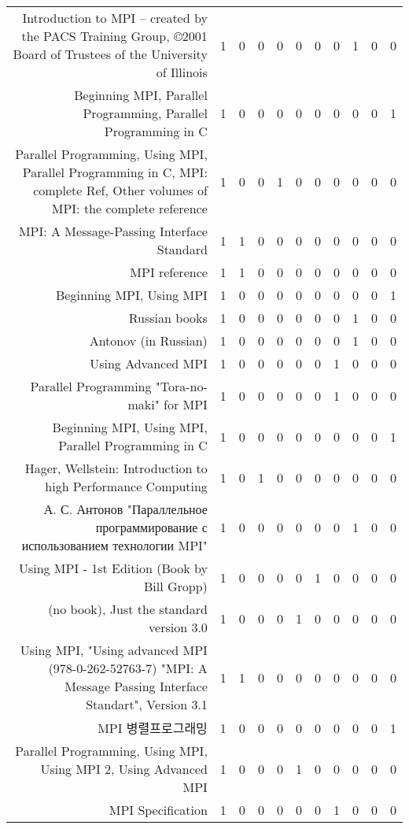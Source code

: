 {\begin{landscape}
\begin{longtable}[htb]{r|c|c|c|c|c|c|c|c|c|c}
{Introduction to MPI – created by the PACS Training Group, ©2001 Board of Trustees of the University of Illinois} & 1 & 0 & 0 & 0 & 0 & 0 & 0 & 1 & 0 & 0 \\%
{Beginning MPI, Parallel Programming, Parallel Programming in C} & 1 & 0 & 0 & 0 & 0 & 0 & 0 & 0 & 0 & 1 \\%
{Parallel Programming, Using MPI, Parallel Programming in C, MPI: complete Ref, Other volumes of MPI: the complete reference} & 1 & 0 & 0 & 1 & 0 & 0 & 0 & 0 & 0 & 0 \\%
{MPI: A Message-Passing Interface Standard} & 1 & 1 & 0 & 0 & 0 & 0 & 0 & 0 & 0 & 0 \\%
{MPI reference} & 1 & 1 & 0 & 0 & 0 & 0 & 0 & 0 & 0 & 0 \\%
{Beginning MPI, Using MPI} & 1 & 0 & 0 & 0 & 0 & 0 & 0 & 0 & 0 & 1 \\%
{Russian books} & 1 & 0 & 0 & 0 & 0 & 0 & 0 & 1 & 0 & 0 \\%
{Antonov (in Russian)} & 1 & 0 & 0 & 0 & 0 & 0 & 0 & 1 & 0 & 0 \\%
{Using Advanced MPI} & 1 & 0 & 0 & 0 & 0 & 0 & 1 & 0 & 0 & 0 \\%
{Parallel Programming "Tora-no-maki" for MPI} & 1 & 0 & 0 & 0 & 0 & 0 & 1 & 0 & 0 & 0 \\%
{Beginning MPI, Using MPI, Parallel Programming in C} & 1 & 0 & 0 & 0 & 0 & 0 & 0 & 0 & 0 & 1 \\%
{Hager, Wellstein: Introduction to high Performance Computing} & 1 & 0 & 1 & 0 & 0 & 0 & 0 & 0 & 0 & 0 \\%
{А. С. Антонов "Параллельное программирование с использованием технологии MPI"} & 1 & 0 & 0 & 0 & 0 & 0 & 0 & 1 & 0 & 0 \\%
{Using MPI - 1st Edition (Book by Bill Gropp)} & 1 & 0 & 0 & 0 & 0 & 1 & 0 & 0 & 0 & 0 \\%
{(no book), Just the standard version 3.0} & 1 & 0 & 0 & 0 & 1 & 0 & 0 & 0 & 0 & 0 \\%
{Using MPI, "Using advanced MPI (978-0-262-52763-7)  "MPI: A Message Passing Interface Standart", Version 3.1} & 1 & 1 & 0 & 0 & 0 & 0 & 0 & 0 & 0 & 0 \\%
{MPI 병렬프로그래밍} & 1 & 0 & 0 & 0 & 0 & 0 & 0 & 0 & 0 & 1 \\%
{Parallel Programming, Using MPI, Using MPI 2, Using Advanced MPI} & 1 & 0 & 0 & 0 & 1 & 0 & 0 & 0 & 0 & 0 \\%
{MPI Specification} & 1 & 0 & 0 & 0 & 0 & 0 & 1 & 0 & 0 & 0 \\%

\end{longtable}
\end{landscape}}
